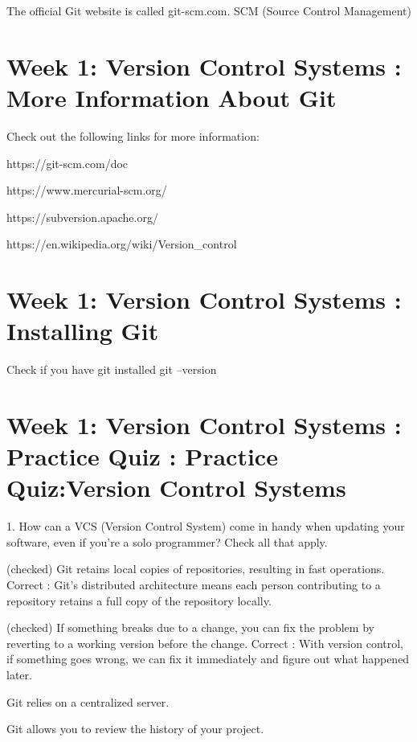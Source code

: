 \documentclass[11pt, onecolumn]{article}
\begin{document}
The official Git website is called git-scm.com. SCM (Source Control Management) 


\section{Week 1: Version Control Systems : More Information About Git}

Check out the following links for more information:

    https://git-scm.com/doc

    https://www.mercurial-scm.org/

    https://subversion.apache.org/

    https://en.wikipedia.org/wiki/Version_control


\section{Week 1: Version Control Systems : Installing Git}

Check if you have git installed
git --version


\section{Week 1: Version Control Systems : Practice Quiz : Practice Quiz:Version Control Systems}

1. How can a VCS (Version Control System) come in handy when updating your software, even if you’re a solo programmer? Check all that apply.

(checked) Git retains local copies of repositories, resulting in fast operations.
Correct : Git's distributed architecture means each person contributing to a repository retains a full copy of the repository locally.

(checked) If something breaks due to a change, you can fix the problem by reverting to a working version before the change.
Correct : With version control, if something goes wrong, we can fix it immediately and figure out what happened later.

Git relies on a centralized server.

Git allows you to review the history of your project.
\end{document}

